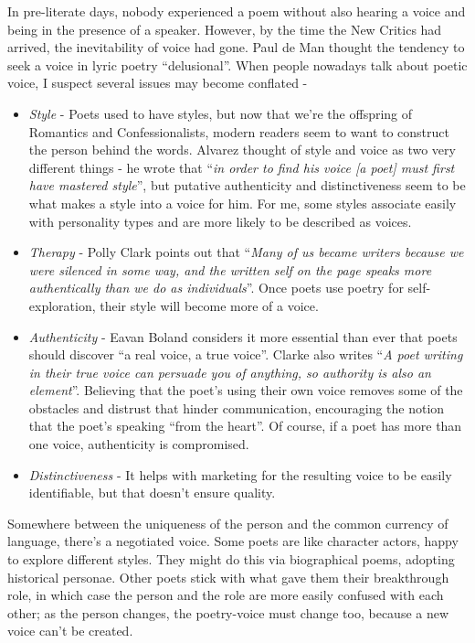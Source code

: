 \documentclass[11pt]{article}
\begin{document}
In pre-literate days, nobody experienced a poem without also hearing a voice and being in the presence of a speaker. However, by the time the New Critics had arrived, the inevitability of voice had gone. Paul de Man thought the tendency to seek a voice in lyric poetry ``delusional''. When people nowadays talk about poetic voice, I suspect several issues may become conflated - 
\begin{itemize}
\item \textit{Style} - Poets used to have styles, but now that we're the offspring of Romantics and Confessionalists, modern readers seem to want to construct the person behind the words. Alvarez thought of style and voice as two very different things - he wrote that ``\textit{in order to find his voice [a poet] must first have mastered style}'', but putative authenticity and distinctiveness seem to be what makes a style into a voice for him. For me, some styles associate easily with personality types and are more likely to be described as voices.
\item \textit{Therapy} - Polly Clark points out that ``\textit{Many of us became writers because we were silenced in some way, and the written self on the page speaks more authentically than we do as individuals}''. Once poets use poetry for self-exploration, their style will become more of a voice.
\item \textit{Authenticity} - Eavan Boland considers it more essential than ever that poets should discover ``a real voice, a true voice''. Clarke also writes ``\textit{A poet writing in their true voice can persuade you of anything, so authority is also an element}''. Believing that the poet's using their own voice removes some of the obstacles and distrust that hinder communication, encouraging the notion that the poet's speaking ``from the heart''. Of course, if a poet has more than one voice, authenticity is compromised.
\item \textit{Distinctiveness} - It helps with marketing for the resulting voice to be easily identifiable, but that doesn't ensure quality.
\end{itemize}


Somewhere between the uniqueness of the person and the common currency of language, there's a negotiated voice. Some poets are like character actors, happy to explore different styles. They might do this via biographical poems, adopting historical personae. Other poets stick with what gave them their breakthrough role, in which case the person and the role are more easily confused with each other; as the person changes, the poetry-voice must change too, because a new voice can't be created. 
\end{document}
